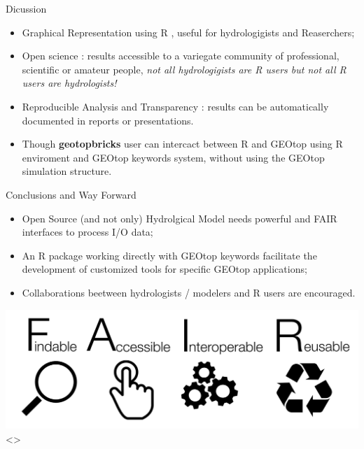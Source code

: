 \documentclass[ignorenonframetext,]{beamer}
\providecommand{\tightlist}{%
  \setlength{\itemsep}{0pt}\setlength{\parskip}{0pt}}
\begin{document}
\begin{frame}{Dicussion}

\begin{itemize}
\tightlist
\item
  Graphical Representation using R , useful for hydrologigists and
  Reaserchers;
\item
  Open science : results accessible to a variegate community of
  professional, scientific or amateur people, \emph{\emph{not all
  hydrologigists are R users but not all R users are hydrologists! }}
\item
  Reproducible Analysis and Transparency : results can be automatically
  documented in reports or presentations.
\item
  Though \textbf{geotopbricks} user can intercact between R and GEOtop
  using R enviroment and GEOtop keywords system, without using the
  GEOtop simulation structure.
\end{itemize}

\end{frame}

\begin{frame}{Conclusions and Way Forward}

\begin{itemize}
\item
  Open Source (and not only) Hydrolgical Model needs powerful and FAIR
  interfaces to process I/O data;
\item
  An R package working directly with GEOtop keywords facilitate the
  development of customized tools for specific GEOtop applications;
\item
  Collaborations beetween hydrologists / modelers and R users are
  encouraged.
\end{itemize}

\includegraphics{resources/images/FAIR_data_principles.jpg}\textless{}\center\textgreater{}

\end{frame}
\end{document}
